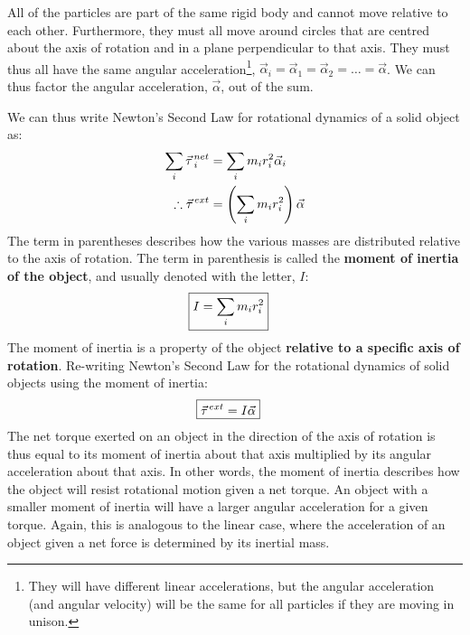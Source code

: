 All of the particles are part of the same rigid body and cannot move relative to each other. Furthermore, they must all move around circles that are centred about the axis of rotation and in a plane perpendicular to that axis. They must thus all have the same angular acceleration\footnote{They will have different linear accelerations, but the angular acceleration (and angular velocity) will be the same for all particles if they are moving in unison.}, $\vec\alpha_i = \vec \alpha_1 = \vec \alpha_2 =\dots=\vec\alpha$. We can thus factor the angular acceleration, $\vec \alpha$, out of the sum.

We can thus write Newton's Second Law for rotational dynamics of a solid object as:
\begin{align*}
\sum_i \pvec\tau_i^{net} &= \sum_i  m_ir_i^2\vec\alpha_i\\
\therefore \pvec\tau^{ext}&= \left(\sum_i  m_ir_i^2\right)\vec\alpha
\end{align*}
The term in parentheses describes how the various masses are distributed relative to the axis of rotation. The term in parenthesis is called the \textbf{moment of inertia of the object}, and usually denoted with the letter, $I$:
\begin{align}
\Aboxed{I = \sum_i  m_ir_i^2}
\end{align}
The moment of inertia is a property of the object \textbf{relative to a specific axis of rotation}. Re-writing Newton's Second Law for the rotational dynamics of solid objects using the moment of inertia:
\begin{align}
\Aboxed{\pvec\tau^{ext}&= I\vec\alpha}
\end{align}
The net torque exerted on an object in the direction of the axis of rotation is thus equal to its moment of inertia about that axis multiplied by its angular acceleration about that axis. In other words, the moment of inertia describes how the object will resist rotational motion given a net torque. An object with a smaller moment of inertia will have a larger angular acceleration for a given torque. Again, this is analogous to the linear case, where the acceleration of an object given a net force is determined by its inertial mass.
\vspace{-0.25cm}
